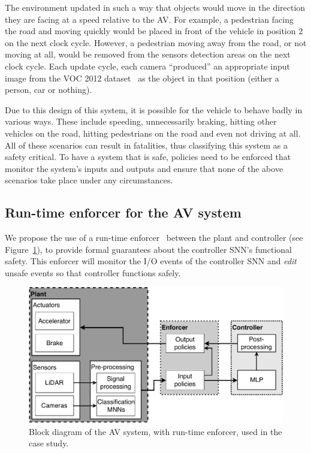 The environment updated in such a way that objects would move in the direction they are facing at a speed relative to the \ac{AV}.
For example, a pedestrian facing the road and moving quickly would be placed in front of the vehicle in position 2 on the next clock cycle.
However, a pedestrian moving away from the road, or not moving at all, would be removed from the sensors detection areas on the next clock cycle.
Each update cycle, each camera ``produced'' an appropriate input image from the \ac{VOC} 2012 dataset~\cite{pascal-voc-2012} as the object in that position (either a person, car or nothing).

Due to this design of this system, it is possible for the vehicle to behave badly in various ways. 
These include speeding, unnecessarily braking, hitting other vehicles on the road, hitting pedestrians on the road and even not driving at all.
All of these scenarios can result in fatalities, thus classifying this system as a safety critical.
To have a system that is safe, policies need to be enforced that monitor the system's inputs and outputs and ensure that none of the above scenarios take place under any circumstances.

\subsection{Run-time enforcer for the \acf{AV} system}
We propose the use of a run-time enforcer~\cite{recps} between the plant and controller (see Figure~\ref{fig:avenf}), to provide formal guarantees about the controller \ac{SNN}'s functional safety.
This enforcer will monitor the I/O events of the controller \ac{SNN} and \textit{edit} unsafe events so that controller functions safely.

\begin{figure}[h]
	\centering
	\includegraphics[width=\textwidth]{Content/fig/AV-sys.pdf}
	\caption{Block diagram of the \ac{AV} system, with run-time enforcer, used in the case study. \label{fig:avenf}}
\end{figure}

